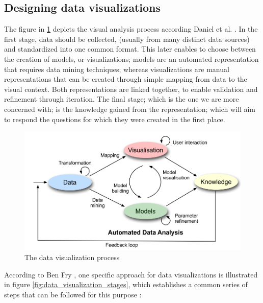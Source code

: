 \subsection{Designing data visualizations}
The figure in \ref{fig:data_visualization_process} depicts the visual analysis process according Daniel et al. \cite{KeimDaniel2010}. In the first stage,  data should be collected, (usually from many distinct data sources) and standardized into one common format. This later enables to choose between the creation of models, or visualizations; models are an automated representation that requires data mining techniques; whereas visualizations are manual representations that can be created through simple mapping from data to the visual context. Both representations are linked together, to enable validation and refinement through iteration. The final stage; which is the one we are more concerned with; is the knowledge gained from the representation; which will aim to respond the questions for which they were created in the first place.
\begin{figure}[!htb]
\begin{adjustbox}{width=1\textwidth,center=\textwidth}
  \centering
  \includegraphics[scale=1]{images/data_visualization_process.png}
\end{adjustbox}
  \caption[The data visualization process]{The data visualization process \cite{KeimDaniel2010} }
  \label{fig:data_visualization_process}
\end{figure}

According to Ben Fry \cite{Cleveland1993}, one specific approach for data visualizations is illustrated in figure \ref{fig:data_visualization_stages}, which establishes a common series of steps that can be followed for this purpose :

